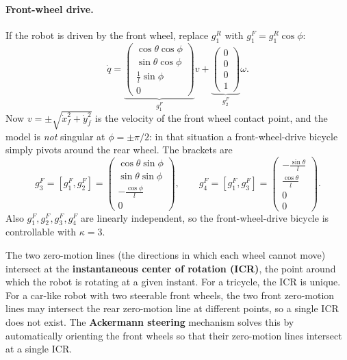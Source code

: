 \paragraph{Front-wheel drive.}
If the robot is driven by the front wheel, replace \( g_1^R \) with
\( g_1^F = g_1^R \cos\phi \):
\begin{equation}
\label{eq:bicycle-front}
\dot{q} =
\underbrace{
\begin{pmatrix}
    \cos\theta \cos\phi \\ \sin\theta \cos\phi \\ \frac{1}{l}\sin\phi \\ 0
\end{pmatrix}}_{g_1^F} v
+ \underbrace{\begin{pmatrix} 0 \\ 0 \\ 0 \\ 1 \end{pmatrix}}_{g_2^F} \omega.
\end{equation}
Now \( v = \pm\sqrt{\dot{x}_f^2 + \dot{y}_f^2} \) is the velocity of the
front wheel contact point, and the model is \emph{not} singular at
\( \phi = \pm\pi/2 \): in that situation a front-wheel-drive bicycle
simply pivots around the rear wheel. The brackets are
\[
g_3^F = [g_1^F, g_2^F] =
\begin{pmatrix}
    \cos\theta \sin\phi \\ \sin\theta \sin\phi \\ -\frac{\cos\phi}{l} \\ 0
\end{pmatrix},
\qquad
g_4^F = [g_1^F, g_3^F] =
\begin{pmatrix}
    -\frac{\sin\theta}{l} \\ \frac{\cos\theta}{l} \\ 0 \\ 0
\end{pmatrix}.
\]
Also \( g_1^F, g_2^F, g_3^F, g_4^F \) are linearly independent, so the
front-wheel-drive bicycle is controllable with \( \kappa = 3 \).

\begin{nb}
The two zero-motion lines (the directions in which each wheel cannot
move) intersect at the \textbf{instantaneous center of rotation
(ICR)}, the point around which the robot is rotating at a given
instant. For a tricycle, the ICR is unique. For a car-like robot with
two steerable front wheels, the two front zero-motion lines may
intersect the rear zero-motion line at different points, so a single
ICR does not exist. The \textbf{Ackermann steering} mechanism solves
this by automatically orienting the front wheels so that their
zero-motion lines intersect at a single ICR.
\end{nb}

